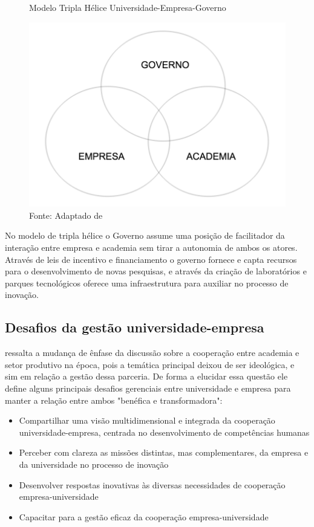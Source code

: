 \begin{figure}[H]
\caption{Modelo Tripla Hélice Universidade-Empresa-Governo}
\centerline{\includegraphics[scale=0.5]{img/triplehelix3}}
\label{fig:triplehelix3}
\caption* {Fonte: Adaptado de }
\end{figure}

No modelo de tripla hélice o Governo assume uma posição de facilitador da interação entre empresa e academia sem tirar a autonomia de ambos os atores. Através de leis de incentivo e financiamento o governo fornece e capta recursos para o desenvolvimento de novas pesquisas, e através da criação de laboratórios e parques tecnológicos oferece uma infraestrutura para  auxiliar no processo de inovação.

\subsection{Desafios da gestão universidade-empresa}
\label{cha:univ_empreend}

 ressalta a mudança de ênfase da discussão sobre a cooperação entre academia e setor produtivo na época, pois a temática principal deixou de ser ideológica, e sim em relação a gestão dessa parceria. De forma a elucidar essa questão ele define alguns principais desafios gerenciais entre universidade e empresa para manter a relação entre ambos "benéfica e transformadora":

\begin{itemize}
\item Compartilhar uma visão multidimensional e integrada da cooperação universidade-empresa, centrada no desenvolvimento de competências humanas
\item Perceber com clareza as missões distintas, mas complementares, da empresa e da universidade no processo de inovação
\item Desenvolver respostas inovativas às diversas necessidades de cooperação empresa-universidade
\item Capacitar para a gestão eficaz da cooperação empresa-universidade
\end{itemize}

